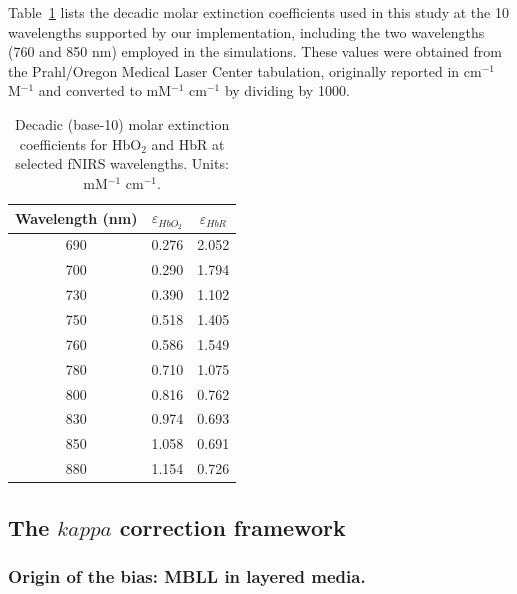 \documentclass[11pt]{article}
\def\kappa{kappa}%
\def\mathrm#1{#1}%
\def\,{ }%
\begin{document}
Table~\ref{tab:extinction} lists the decadic molar extinction coefficients used in this study at the 10 wavelengths supported by our implementation, including the two wavelengths (760 and 850\,nm) employed in the simulations. These values were obtained from the Prahl/Oregon Medical Laser Center tabulation\cite{r23}, originally reported in cm$^{-1}$\,M$^{-1}$ and converted to mM$^{-1}$\,cm$^{-1}$ by dividing by 1000.

\begin{table}[ht]
\centering
\caption{Decadic (base-10) molar extinction coefficients for HbO$_2$ and HbR at selected fNIRS wavelengths\cite{r23}. Units: mM$^{-1}$\,cm$^{-1}$.}
\label{tab:extinction}
\begin{tabular}{@{}ccc@{}}
\toprule
\textbf{Wavelength (nm)} & $\varepsilon_{\mathrm{HbO_2}}$ & $\varepsilon_{\mathrm{HbR}}$ \\
\midrule
690 & 0.276 & 2.052 \\
700 & 0.290 & 1.794 \\
730 & 0.390 & 1.102 \\
750 & 0.518 & 1.405 \\
760 & 0.586 & 1.549 \\
780 & 0.710 & 1.075 \\
800 & 0.816 & 0.762 \\
830 & 0.974 & 0.693 \\
850 & 1.058 & 0.691 \\
880 & 1.154 & 0.726 \\
\bottomrule
\end{tabular}
\end{table}

\subsection{The \texorpdfstring{$\kappa$}{kappa} correction framework}

\subsubsection{Origin of the bias: MBLL in layered media.}
\end{document}
